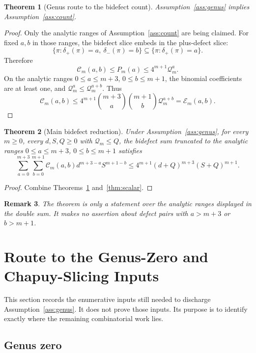 \documentclass[11pt]{article}
\numberwithin{equation}{section}
\newtheorem{theorem}{Theorem}[section]
\newtheorem{remark}[theorem]{Remark}
\newcommand{\dplus}{\delta_+}
\newcommand{\dminus}{\delta_-}
\newcommand{\Count}{\mathcal C}
\newcommand{\Envelope}{\mathcal E}
\newcommand{\Qloss}{\mathcal Q}
\begin{document}
\begin{theorem}[Genus route to the bidefect count]\label{thm:bidefect}
Assumption~\ref{ass:genus} implies Assumption~\ref{ass:count}.
\end{theorem}

\begin{proof}
Only the analytic ranges of Assumption~\ref{ass:count} are being claimed.
For fixed \(a,b\) in those ranges, the bidefect slice embeds in the
plus-defect slice:
\[
  \{\pi:\dplus(\pi)=a,\ \dminus(\pi)=b\}
  \subseteq
  \{\pi:\dplus(\pi)=a\}.
\]
Therefore
\[
  \Count_m(a,b)\le P_m(a)
  \le 4^{m+1}\Qloss_m^a.
\]
On the analytic ranges \(0\le a\le m+3\), \(0\le b\le m+1\), the binomial
coefficients are at least one, and \(\Qloss_m^a\le \Qloss_m^{a+b}\).
Thus
\[
  \Count_m(a,b)
  \le
  4^{m+1}\binom{m+3}{a}\binom{m+1}{b}\Qloss_m^{a+b}
  =
  \Envelope_m(a,b).
\]
\end{proof}

\begin{theorem}[Main bidefect reduction]\label{thm:main}
Under Assumption~\ref{ass:genus}, for every \(m\ge0\), every \(d,S,Q\ge0\)
with \(\Qloss_m\le Q\), the bidefect sum truncated to the analytic ranges
\(0\le a\le m+3\), \(0\le b\le m+1\) satisfies
\[
\sum_{a=0}^{m+3}\sum_{b=0}^{m+1}
  \Count_m(a,b)d^{m+3-a}S^{m+1-b}
  \le
  4^{m+1}(d+Q)^{m+3}(S+Q)^{m+1}.
\]
\end{theorem}

\begin{proof}
Combine Theorems~\ref{thm:bidefect} and~\ref{thm:scalar}.
\end{proof}

\begin{remark}
The theorem is only a statement over the analytic ranges displayed in the
double sum.  It makes no assertion about defect pairs with \(a>m+3\) or
\(b>m+1\).
\end{remark}

\section{Route to the Genus-Zero and Chapuy-Slicing Inputs}

This section records the enumerative inputs still needed to discharge
Assumption~\ref{ass:genus}.  It does not prove those inputs.  Its purpose is
to identify exactly where the remaining combinatorial work lies.

\subsection{Genus zero}
\end{document}
